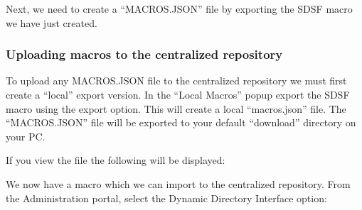 \documentclass[letterpaper,10pt,english]{sphinxmanual}
\begin{document}
\sphinxAtStartPar
{}

\sphinxAtStartPar
Next, we need to create a “MACROS.JSON” file by exporting the SDSF macro we have just created.

\ignorespaces 

\subsubsection{Uploading macros to the centralized repository}
\label{\detokenize{Customization:uploading-macros-to-the-centralized-repository}}\label{\detokenize{Customization:index-87}}
\sphinxAtStartPar
To upload any MACROS.JSON file to the centralized repository we must first create a “local” export version. In the “Local Macros” popup export the SDSF macro using the export option. This will create a local “macros.json” file. The “MACROS.JSON” file will be exported to your default “download” directory on your PC.

\sphinxAtStartPar
If you view the file the following will be displayed:

\begin{sphinxVerbatim}[commandchars=\\\{\}]
\PYG{p}{[}
    \PYG{p}{[}\PYG{p}{]}
    \PYG{p}{]}
\end{sphinxVerbatim}

\sphinxAtStartPar
We now have a macro which we can import to the centralized repository. From the Administration portal, select the Dynamic Directory Interface option:
\end{document}
